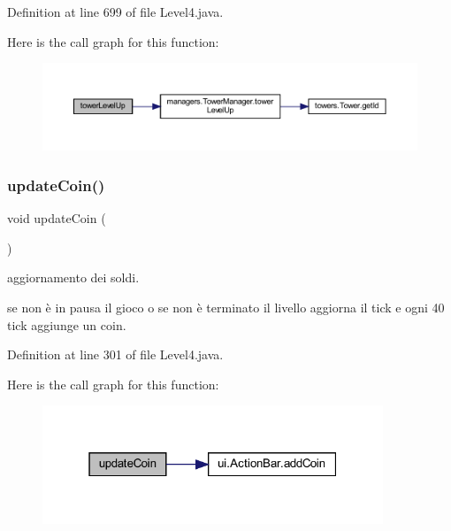 Definition at line 699 of file Level4.\+java.

Here is the call graph for this function\+:\nopagebreak
\begin{figure}[H]
\begin{center}
\leavevmode
\includegraphics[width=350pt]{classscenes_1_1_level4_a8a3c715fcfd3d65e1d8241a1fa4965ff_cgraph}
\end{center}
\end{figure}
\mbox{\label{classscenes_1_1_level4_a7ca93fcd8c7440e7b3f64c595a5be28c}} 
\subsubsection{\texorpdfstring{update\+Coin()}{updateCoin()}}
{\footnotesize\ttfamily void update\+Coin (\begin{DoxyParamCaption}{ }\end{DoxyParamCaption})}



aggiornamento dei soldi. 

se non è in pausa il gioco o se non è terminato il livello aggiorna il tick e ogni 40 tick aggiunge un coin. 

Definition at line 301 of file Level4.\+java.

Here is the call graph for this function\+:\nopagebreak
\begin{figure}[H]
\begin{center}
\leavevmode
\includegraphics[width=289pt]{classscenes_1_1_level4_a7ca93fcd8c7440e7b3f64c595a5be28c_cgraph}
\end{center}
\end{figure}
\mbox{\label{classscenes_1_1_level4_af005ec68c869a6acd5e833cba9330a50}} 

